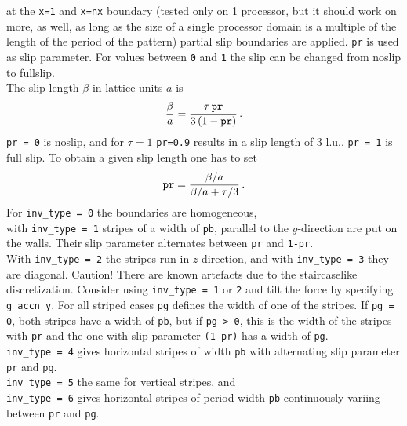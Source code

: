\documentclass[a4paper]{article}
\begin{document}
\begin{description}
                at the {\tt x=1} and {\tt x=nx} boundary (tested only on 1 processor, but it 
                should work on more, as well, as long as the size of a single 
                processor domain is a multiple of the length of the period of the pattern)
                partial slip boundaries are applied\cite{bib:ahmed09}. {\tt pr} is used as slip parameter.
                For values between {\tt 0} and {\tt 1} the slip can be changed from 
                noslip to fullslip. \\
                The slip length $\beta$ in lattice units $a$ is 
                \[
                 \frac{\beta}{a} = 
                  \frac{\tau \,{\tt pr}}{3\,(1-{\tt pr})}\,.
                 \]
                {\tt pr = 0} is noslip, and for $\tau=1$ {\tt pr=0.9} results in 
                a slip length of 3 l.u.. {\tt pr = 1} is full slip.
                To obtain a given slip length one has to set 
                \[
                  {\tt pr} = \frac{\beta/a}{\beta/a+\tau/3}\,. 
                 \]
                For {\tt inv\_type = 0} the boundaries are homogeneous,\\
                with {\tt inv\_type = 1} stripes of a width of {\tt pb}, 
                parallel to the $y$-direction are put on the walls. 
                Their slip parameter alternates between {\tt pr} and {\tt 1-pr}. \\
                With {\tt inv\_type = 2} the stripes run in $z$-direction,
                and with {\tt inv\_type = 3} they are diagonal. Caution! There are known
                artefacts due to the staircaselike discretization. Consider using 
                {\tt inv\_type = 1} or {\tt 2} and tilt the force by specifying 
                {\tt g\_accn\_y}.
                For all striped cases {\tt pg} defines the width of one of the stripes.
                If {\tt pg = 0}, both stripes have a width of {\tt pb}, but if {\tt pg > 0}, 
                this is the width of the stripes with {\tt pr} and the one with slip 
                parameter {\tt (1-pr)} has a width of {\tt pg}.\\
                {\tt inv\_type = 4} gives horizontal stripes of width {\tt pb} with 
                alternating slip parameter {\tt pr} and {\tt pg}.\\
                {\tt inv\_type = 5} the same for vertical stripes, and\\
                {\tt inv\_type = 6} gives horizontal stripes of period width {\tt pb} 
                continuously variing between {\tt pr} and {\tt pg}.

\end{description}
\end{document}
